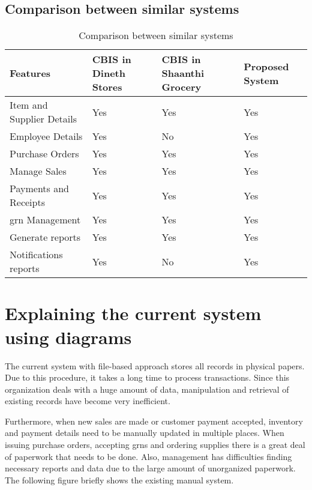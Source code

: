 \documentclass[12pt]{report}
\begin{document}
\subsection{Comparison between similar systems}
\begin{table}[H]
	\centering
	\begin{tabular}{ |p{4.5cm}|p{3cm}|p{3cm}|p{2cm}| }
		\hline
		\bf{Features}             & \bf{CBIS in Dineth Stores} & \bf{CBIS in Shaanthi Grocery} & \bf{Proposed System} \\
		\hline
		Item and Supplier Details & Yes                        & Yes                           & Yes                  \\
		\hline
		Employee Details          & Yes                        & No                            & Yes                  \\
		\hline
		Purchase Orders           & Yes                        & Yes                           & Yes                  \\
		\hline
		Manage Sales              & Yes                        & Yes                           & Yes                  \\
		\hline
		Payments and Receipts     & Yes                        & Yes                           & Yes                  \\
		\hline
		\acrshort{grn} Management & Yes                        & Yes                           & Yes                  \\
		\hline
		Generate reports          & Yes                        & Yes                           & Yes                  \\
		\hline
		Notifications reports     & Yes                        & No                            & Yes                  \\
		\hline
	\end{tabular}
	\caption{Comparison between similar systems}
\end{table}

\section{Explaining the current system using diagrams}
The current system with file-based approach stores all records in physical papers. Due to this procedure, it takes a long time to process transactions. Since this organization deals with a huge amount of data, manipulation and retrieval of existing records have become very inefficient.

Furthermore, when new sales are made or customer payment accepted, inventory and payment details need to be manually updated in multiple places. When issuing purchase orders, accepting \acrshort{grn}s and ordering supplies there is a great deal of paperwork that needs to be done. Also, management has difficulties finding necessary reports and data due to the large amount of unorganized paperwork. The following figure briefly shows the existing manual system.
\end{document}

